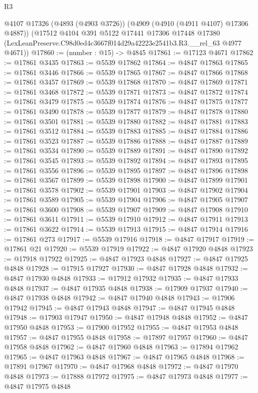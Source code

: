 \begin{lexlean}{R3}
\begin{coremodule}
    @4107
    @17326
    (@4893 (@4903 @3726))
    (@4909 (@4910 (@4911 @4107) @17306 @4887))
    (@17512
      @4104
      @391
      @5122
      @17441
      @17306
      @17448
      @17380
      (LexLeanPreserve.C98d0ed4c3667f014d29a42223e2541b3.R3.__rel_63 @4977 @4671))
@17860 := (number : @15) -> @4845
@17861 := @17123 @4671
@17862 := @17861 @3435
@17863 := @5539 @17862
@17864 := @4847 @17863
@17865 := @17861 @3446
@17866 := @5539 @17865
@17867 := @4847 @17866
@17868 := @17861 @3457
@17869 := @5539 @17868
@17870 := @4847 @17869
@17871 := @17861 @3468
@17872 := @5539 @17871
@17873 := @4847 @17872
@17874 := @17861 @3479
@17875 := @5539 @17874
@17876 := @4847 @17875
@17877 := @17861 @3490
@17878 := @5539 @17877
@17879 := @4847 @17878
@17880 := @17861 @3501
@17881 := @5539 @17880
@17882 := @4847 @17881
@17883 := @17861 @3512
@17884 := @5539 @17883
@17885 := @4847 @17884
@17886 := @17861 @3523
@17887 := @5539 @17886
@17888 := @4847 @17887
@17889 := @17861 @3534
@17890 := @5539 @17889
@17891 := @4847 @17890
@17892 := @17861 @3545
@17893 := @5539 @17892
@17894 := @4847 @17893
@17895 := @17861 @3556
@17896 := @5539 @17895
@17897 := @4847 @17896
@17898 := @17861 @3567
@17899 := @5539 @17898
@17900 := @4847 @17899
@17901 := @17861 @3578
@17902 := @5539 @17901
@17903 := @4847 @17902
@17904 := @17861 @3589
@17905 := @5539 @17904
@17906 := @4847 @17905
@17907 := @17861 @3600
@17908 := @5539 @17907
@17909 := @4847 @17908
@17910 := @17861 @3611
@17911 := @5539 @17910
@17912 := @4847 @17911
@17913 := @17861 @3622
@17914 := @5539 @17913
@17915 := @4847 @17914
@17916 := @17861 @273
@17917 := @5539 @17916
@17918 := @4847 @17917
@17919 := @17861 @21
@17920 := @5539 @17919
@17922 := @4847 @17920 @4848
@17923 := @17918 @17922
@17925 := @4847 @17923 @4848
@17927 := @4847 @17925 @4848
@17928 := @17915 @17927
@17930 := @4847 @17928 @4848
@17932 := @4847 @17930 @4848
@17933 := @17912 @17932
@17935 := @4847 @17933 @4848
@17937 := @4847 @17935 @4848
@17938 := @17909 @17937
@17940 := @4847 @17938 @4848
@17942 := @4847 @17940 @4848
@17943 := @17906 @17942
@17945 := @4847 @17943 @4848
@17947 := @4847 @17945 @4848
@17948 := @17903 @17947
@17950 := @4847 @17948 @4848
@17952 := @4847 @17950 @4848
@17953 := @17900 @17952
@17955 := @4847 @17953 @4848
@17957 := @4847 @17955 @4848
@17958 := @17897 @17957
@17960 := @4847 @17958 @4848
@17962 := @4847 @17960 @4848
@17963 := @17894 @17962
@17965 := @4847 @17963 @4848
@17967 := @4847 @17965 @4848
@17968 := @17891 @17967
@17970 := @4847 @17968 @4848
@17972 := @4847 @17970 @4848
@17973 := @17888 @17972
@17975 := @4847 @17973 @4848
@17977 := @4847 @17975 @4848

\end{coremodule}
\end{lexlean}
